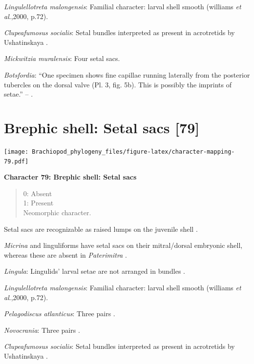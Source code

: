 \documentclass[openany]{book}
\theoremstyle{definition}
\theoremstyle{definition}
\theoremstyle{definition}
\theoremstyle{remark}
\begin{document}
\emph{Lingulellotreta malongensis}: Familial character: larval shell
smooth (williams \emph{et al}.,2000, p.72).

\emph{Clupeafumosus socialis}: Setal bundles interpreted as present in
acrotretids by Ushatinskaya \citeyearpar{Ushatinskaya2016Protegulumand}.

\emph{Mickwitzia muralensis}: Four setal sacs.

\emph{Botsfordia}: ``One specimen shows fine capillae running laterally
from the posterior tubercles on the dorsal valve (Pl. 3, fig. 5b). This
is possibly the imprints of setae.'' --
\citet{Ushatinskaya2016Revisionof}.

\hypertarget{brephic-shell-setal-sacs-79}{%
\section{Brephic shell: Setal sacs
{[}79{]}}\label{brephic-shell-setal-sacs-79}}

\texttt{[image: Brachiopod\_phylogeny\_files/figure-latex/character-mapping-79.pdf]}

\textbf{Character 79: Brephic shell: Setal sacs}

\begin{quote}
0: Absent\\
1: Present\\
Neomorphic character.
\end{quote}

Setal sacs are recognizable as raised lumps on the juvenile shell
\citep[see][]{Bassett2017Earliestontogeny}.

\emph{Micrina} and linguliforms have setal sacs on their mitral/dorsal
embryonic shell, whereas these are absent in \emph{Paterimitra}
\citep{Holmer2011Firstrecord}.

\emph{Lingula}: Lingulids' larval setae are not arranged in bundles
\citep{Carlson1995Phylogeneticrelationships}.

\emph{Lingulellotreta malongensis}: Familial character: larval shell
smooth (williams \emph{et al}.,2000, p.72).

\emph{Pelagodiscus atlanticus}: Three pairs
\citep{Carlson1995Phylogeneticrelationships}.

\emph{Novocrania}: Three pairs
\citep{Carlson1995Phylogeneticrelationships}.

\emph{Clupeafumosus socialis}: Setal bundles interpreted as present in
acrotretids by Ushatinskaya \citeyearpar{Ushatinskaya2016Protegulumand}.
\end{document}
